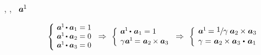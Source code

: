 \begin{otherlanguage}{russian}
,
,
~${\bm{a}^{\hspace{-0.1ex}1}\hspace{-0.1ex}}$

\nopagebreak\vspace{-0.1em}\begin{equation*}
\scalebox{.9}{$\left\{\hspace{-0.16em}\begin{array}{l}
\bm{a}^{\hspace{-0.1ex}1} \hspace{-0.2ex} \dotp \bm{a}_{1} = 1 \\
\bm{a}^{\hspace{-0.1ex}1} \hspace{-0.2ex} \dotp \bm{a}_{2} = 0 \\
\bm{a}^{\hspace{-0.1ex}1} \hspace{-0.2ex} \dotp \bm{a}_{3} = 0 \\[.05em]
\end{array}\right.$}
\Rightarrow\hspace{.33em}
%
\scalebox{.92}{$\left\{\hspace{-0.12em}\begin{array}{l}
\bm{a}^{\hspace{-0.1ex}1} \hspace{-0.2ex} \dotp \hspace{.2ex} \bm{a}_{1} = 1 \\[.1em]
\gamma \hspace{.1ex} \bm{a}^{\hspace{-0.1ex}1} \hspace{-0.2ex} = \hspace{.1ex} \bm{a}_2 \hspace{-0.1ex} \times \bm{a}_3 \\[.08em]
\end{array}\right.$}
\Rightarrow\hspace{.33em}
%
\scalebox{.96}{$\left\{\hspace{-0.11em}\begin{array}{l}
\bm{a}^{\hspace{-0.1ex}1} \hspace{-0.2ex} =
\displaystyle \nicefrac{\scalebox{0.95}{$1$}\hspace{.1ex}}{\scalebox{1.02}{$\gamma$}} \hspace{.5ex}
\bm{a}_2 \hspace{-0.1ex} \times \bm{a}_3 \hspace{.1ex} \\[.08em]
\gamma = \hspace{.1ex} \bm{a}_2 \hspace{-0.1ex} \times \bm{a}_3 \hspace{.1ex} \dotp \hspace{.25ex} \bm{a}_{1} \\[.08em]
\end{array}\right.$}
\end{equation*}


\end{otherlanguage}
